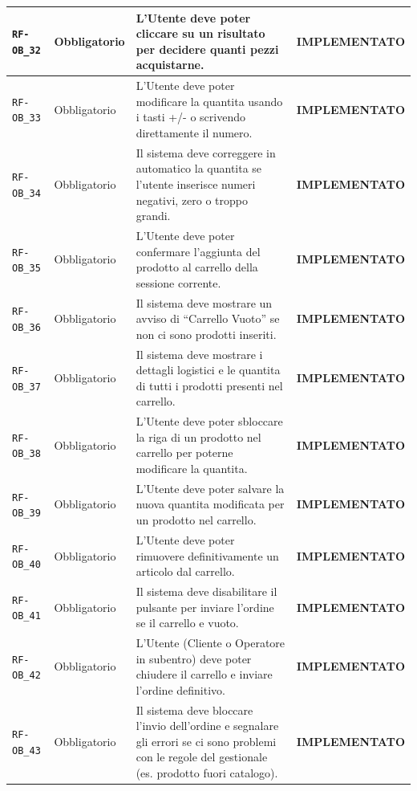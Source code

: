 \documentclass[a4paper, 11pt, oneside]{scrartcl}
\begin{document}
\begin{longtable}{|>{\raggedright\arraybackslash}p{}|>{\raggedright\arraybackslash}p{}|>{\raggedright\arraybackslash}p{}|>{\raggedright\arraybackslash}p{}|}
    \hline
    \texttt{RF-OB\_32} & Obbligatorio & L'Utente deve poter cliccare su un risultato per decidere quanti pezzi acquistarne. & \textbf{IMPLEMENTATO} \\
    \hline
    \texttt{RF-OB\_33} & Obbligatorio & L'Utente deve poter modificare la quantita usando i tasti +/- o scrivendo direttamente il numero. & \textbf{IMPLEMENTATO} \\
    \hline
    \texttt{RF-OB\_34} & Obbligatorio & Il sistema deve correggere in automatico la quantita se l'utente inserisce numeri negativi, zero o troppo grandi. & \textbf{IMPLEMENTATO} \\
    \hline
    \texttt{RF-OB\_35} & Obbligatorio & L'Utente deve poter confermare l'aggiunta del prodotto al carrello della sessione corrente. & \textbf{IMPLEMENTATO} \\
    \hline
    \texttt{RF-OB\_36} & Obbligatorio & Il sistema deve mostrare un avviso di ``Carrello Vuoto'' se non ci sono prodotti inseriti. & \textbf{IMPLEMENTATO} \\
    \hline
    \texttt{RF-OB\_37} & Obbligatorio & Il sistema deve mostrare i dettagli logistici e le quantita di tutti i prodotti presenti nel carrello. & \textbf{IMPLEMENTATO} \\
    \hline
    \texttt{RF-OB\_38} & Obbligatorio & L'Utente deve poter sbloccare la riga di un prodotto nel carrello per poterne modificare la quantita. & \textbf{IMPLEMENTATO} \\
    \hline
    \texttt{RF-OB\_39} & Obbligatorio & L'Utente deve poter salvare la nuova quantita modificata per un prodotto nel carrello. & \textbf{IMPLEMENTATO} \\
    \hline
    \texttt{RF-OB\_40} & Obbligatorio & L'Utente deve poter rimuovere definitivamente un articolo dal carrello. & \textbf{IMPLEMENTATO} \\
    \hline
    \texttt{RF-OB\_41} & Obbligatorio & Il sistema deve disabilitare il pulsante per inviare l'ordine se il carrello e vuoto. & \textbf{IMPLEMENTATO} \\
    \hline
    \texttt{RF-OB\_42} & Obbligatorio & L'Utente (Cliente o Operatore in subentro) deve poter chiudere il carrello e inviare l'ordine definitivo. & \textbf{IMPLEMENTATO} \\
    \hline
    \texttt{RF-OB\_43} & Obbligatorio & Il sistema deve bloccare l'invio dell'ordine e segnalare gli errori se ci sono problemi con le regole del gestionale (es. prodotto fuori catalogo). & \textbf{IMPLEMENTATO} \\
    \hline

\end{longtable}
\end{document}
